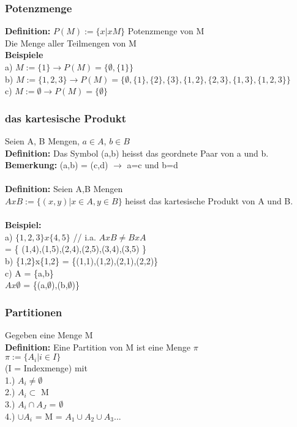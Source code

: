 \documentclass[11pt,a4paper]{article}
\begin{document}
\subsubsection{Potenzmenge}
\textbf{Definition:} $ P(M) := \{ x | x M \} $ Potenzmenge von M\\
Die Menge aller Teilmengen von M\\
\textbf{Beispiele}\\
a) $ M:=\{1\} \rightarrow P(M) = \{\emptyset,\{1\}\}$\\
b) $ M:= \{1,2,3\} \rightarrow P(M) = \{\emptyset, \{1\},\{2\},\{3\},\{1,2\},\{2,3\},\{1,3\},\{1,2,3\}\}$\\
c) $ M:= \emptyset \rightarrow P(M) = \{\emptyset \}$

\subsubsection{das kartesische Produkt}
Seien A, B Mengen, $a \in A$, $b \in B$\\
\textbf{Definition:} Das Symbol (a,b) heisst das geordnete Paar von a und b.\\
\textbf{Bemerkung:} (a,b) = (c,d) $\rightarrow$ a=c und b=d\\\\

\textbf{Definition:} Seien A,B Mengen\\
$AxB := \{ (x,y) | x \in A, y \in B \}$ heisst das kartesische Produkt von A und B.\\\\

\textbf{Beispiel:} \\
a) $\{1,2,3\} x \{4,5\}$ // i.a. $AxB \neq BxA$\\
= \{ (1,4),(1,5),(2,4),(2,5),(3,4),(3,5) \} \\
b) \{1,2\}x\{1,2\} = \{(1,1),(1,2),(2,1),(2,2)\}\\
c) A = \{a,b\}\\
$Ax\emptyset$ = \{(a,$\emptyset$),(b,$\emptyset$)\}\\

\subsubsection{Partitionen}
Gegeben eine Menge M\\
\textbf{Definition:} Eine Partition von M ist eine Menge $\pi$\\
$\pi := \{ A_i | i \in I \}$ \\
(I = Indexmenge) mit \\
1.) $A_i \neq \emptyset$\\
2.) $A_i \subset$ M \\
3.) $A_i \cap A_J$ = $\emptyset$\\
4.) $\cup A_i$ = M = $ A_1 \cup A_2 \cup A_3 ... $\\\\
\end{document}
